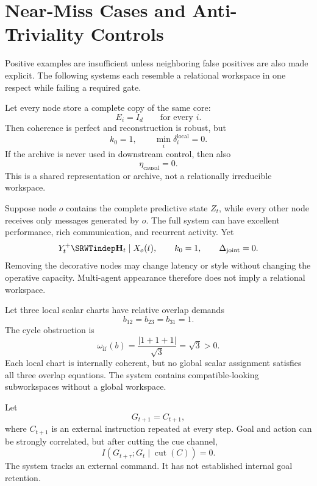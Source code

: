 \section{Near-Miss Cases and Anti-Triviality Controls}

Positive examples are insufficient unless neighboring false positives are also
made explicit. The following systems each resemble a relational workspace in
one respect while failing a required gate.


Let every node store a complete copy of the same core:
\[
E_i=I_d
\qquad\text{for every }i.
\]
Then coherence is perfect and reconstruction is robust, but
\[
k_0=1,
\qquad
\min_i\delta_i^{\mathrm{local}}=0.
\]
If the archive is never used in downstream control, then also
\[
\eta_{\mathrm{causal}}=0.
\]
This is a shared representation or archive, not a relationally irreducible
workspace.


Suppose node \(o\) contains the complete predictive state \(Z_t\), while every
other node receives only messages generated by \(o\). The full system can have
excellent performance, rich communication, and recurrent activity. Yet
\[
Y_t^+\SRWTindep\mathbf H_t\mid X_o(t),
\qquad
k_0=1,
\qquad
\Delta_{\mathrm{joint}}=0.
\]
Removing the decorative nodes may change latency or style without changing the
operative capacity. Multi-agent appearance therefore does not imply a
relational workspace.


Let three local scalar charts have relative overlap demands
\[
b_{12}=b_{23}=b_{31}=1.
\]
The cycle obstruction is
\[
\omega_{\mathcal U}(b)
=
\frac{|1+1+1|}{\sqrt3}
=\sqrt3>0.
\]
Each local chart is internally coherent, but no global scalar assignment
satisfies all three overlap equations. The system contains compatible-looking
subworkspaces without a global workspace.


Let
\[
G_{t+1}=C_{t+1},
\]
where \(C_{t+1}\) is an external instruction repeated at every step. Goal and
action can be strongly correlated, but after cutting the cue channel,
\[
I(G_{t+\tau};G_t\mid\operatorname{cut}(C))=0.
\]
The system tracks an external command. It has not established internal goal
retention.

